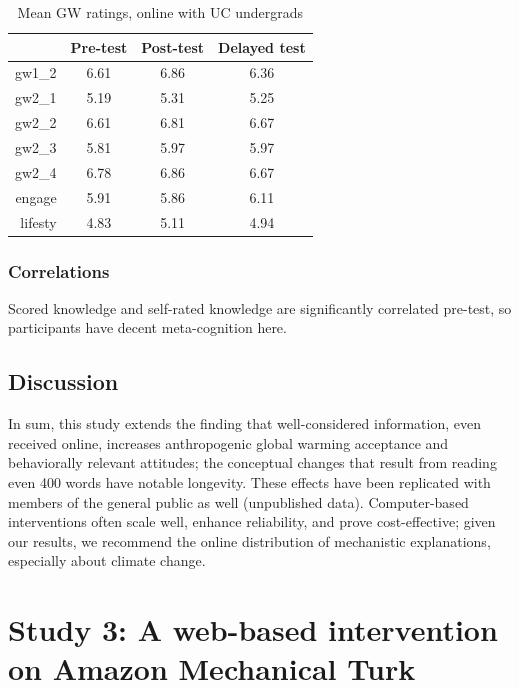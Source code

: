 \begin{table}[h]
\caption{Mean GW ratings, online with UC undergrads} 
\label{table:uc-online-gw-means}
\centering
\begin{tabular}{>{\sffamily}rccc}
  \toprule
 & Pre-test & Post-test & Delayed test \\ 
  \midrule
  gw1\_2 & 6.61 & 6.86 & 6.36 \\ 
  gw2\_1 & 5.19 & 5.31 & 5.25 \\ 
  gw2\_2 & 6.61 & 6.81 & 6.67 \\ 
  gw2\_3 & 5.81 & 5.97 & 5.97 \\ 
  gw2\_4 & 6.78 & 6.86 & 6.67 \\ 
  engage & 5.91 & 5.86 & 6.11 \\ 
  lifesty & 4.83 & 5.11 & 4.94 \\ 
  \bottomrule
\end{tabular}
\end{table}



\subsubsection{Correlations}

Scored knowledge and self-rated knowledge are significantly correlated pre-test,
so participants have decent meta-cognition here.

\subsection{Discussion}

In sum, this study extends the finding that well-considered information, even
received online, increases anthropogenic global warming acceptance and
behaviorally relevant attitudes; the conceptual changes that result from reading
even 400 words have notable longevity. These effects have been replicated with
members of the general public as well (unpublished data). Computer-based
interventions often scale well, enhance reliability, and prove cost-effective;
given our results, we recommend the online distribution of mechanistic
explanations, especially about climate change.  




\section{Study 3: A web-based intervention on Amazon Mechanical Turk}

